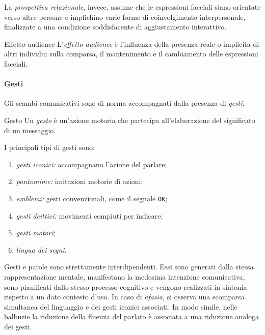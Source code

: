 \documentclass[a4paper]{article}
\begin{document}
La \emph{prospettiva relazionale}, invece, assume che le espressioni facciali siano orientate verso altre persone e implichino varie forme di coinvolgimento interpersonale, finalizzate a una condizione soddisfacente di aggiustamento interattivo.
\begin{snippetdefinition}{Effetto audience}
    L'\emph{effetto audience} è l'influenza della presenza reale o implicita di altri individui sulla comparsa, il mantenimento e il cambiamento delle espressioni facciali.
\end{snippetdefinition}
\paragraph{Gesti}
Gli scambi comunicativi sono di norma accompagnati dalla presenza di \emph{gesti}.
\begin{snippetdefinition}{Gesto}
    Un \emph{gesto} è un'azione motoria che partecipa all'elaborazione del significato di un messaggio.
\end{snippetdefinition}
I principali tipi di gesti sono:
\begin{enumerate}
    \item \emph{gesti iconici:} accompagnano l'azione del parlare;
    \item \emph{pantomime:} imitazioni motorie di azioni;
    \item \emph{emblemi:} gesti convenzionali, come il segnale \texttt{OK};
    \item \emph{gesti deittici:} movimenti compiuti per indicare;
    \item \emph{gesti motori};
    \item \emph{lingua dei segni}.
\end{enumerate}
Gesti e parole sono strettamente interdipendenti. Essi sono generati dalla stessa rappresentazione mentale, manifestano la medesima intenzione comunicativa, sono pianificati dallo stesso processo cognitivo e vengono realizzati in sintonia rispetto a un dato contesto d'uso.
In caso di \emph{afasia}, si osserva una scomparsa simultanea del linguaggio e dei gesti iconici associati. In modo simile, nelle balbuzie la riduzione della fluenza del parlato è associata a una riduzione analoga dei gesti.
\end{document}
